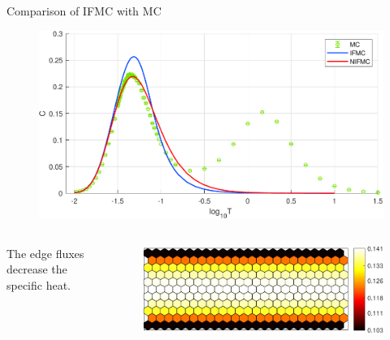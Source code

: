 \begin{frame}{Comparison of IFMC with MC}
    \begin{figure}
        \centering
        \begin{minipage}[c]{.7\textwidth}
            \includegraphics[width = 1\textwidth]{figures/C_cir_24_wid_6_cyl.pdf}
        \end{minipage}
    \end{figure}
    \begin{columns}[t]
            \begin{center}
                The edge fluxes decrease the specific heat.
            \end{center}
            \begin{figure}
                \begin{minipage}[c]{.5\textwidth}
                    \includegraphics[width = 1\textwidth]{figures/one_flux.pdf}
                \end{minipage}
            \end{figure}   
    \end{columns}
\end{frame}




